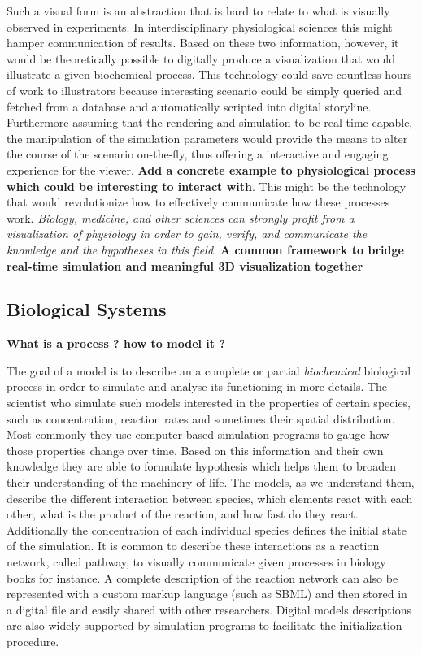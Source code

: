 Such a visual form is an abstraction that is hard to relate to what is visually observed in experiments. 
In interdisciplinary physiological sciences this might hamper communication of results. 
Based on these two information, however, it would be theoretically possible to digitally produce a visualization that would illustrate a given biochemical process.
This technology could save countless hours of work to illustrators because interesting scenario could be simply queried and fetched from a database and automatically scripted into digital storyline.
Furthermore assuming that the rendering and simulation to be real-time capable, the manipulation of the simulation parameters would provide the means to alter the course of the scenario on-the-fly, thus offering a interactive and engaging experience for the viewer.
\textbf{Add a concrete example to physiological process which could be interesting to interact with}.
This might be the technology that would revolutionize how to effectively communicate how these processes work.
\textit{Biology, medicine, and other sciences can strongly profit from a visualization of physiology in order to gain, verify, and communicate the knowledge and the hypotheses in this field.}
\textbf{A common framework to bridge real-time simulation and meaningful 3D visualization together}

%
%

\subsection{Biological Systems}

\textbf{What is a process ? how to model it ?}

The goal of a model is to describe an a complete or partial \textit{biochemical} biological process in order to simulate and analyse its functioning in more details.
The scientist who simulate such models interested in the properties of certain species, such as concentration, reaction rates and sometimes their spatial distribution.
Most commonly they use computer-based simulation programs to gauge how those properties change over time.
Based on this information and their own knowledge they are able to formulate hypothesis which helps them to broaden their understanding of the machinery of life. 
The models, as we understand them, describe the different interaction between species, which elements react with each other, what is the product of the reaction, and how fast do they react.
Additionally the concentration of each individual species defines the initial state of the simulation.
It is common to describe these interactions as a reaction network, called pathway, to visually communicate given processes in biology books for instance.
A complete description of the reaction network can also be represented with a custom markup language (such as SBML) and then stored in a digital file and easily shared with other researchers.
Digital models descriptions are also widely supported by simulation programs to facilitate the initialization procedure.

